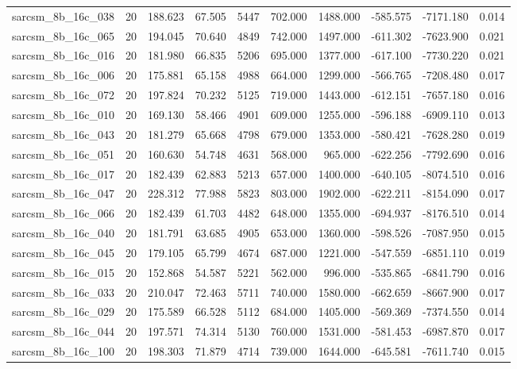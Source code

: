 \begin{tabular}{lrrrrrrrrr}
sarcsm\_8b\_16c\_038 & 20 & 188.623 & 67.505 & 5447 & 702.000 & 1488.000 & -585.575 & -7171.180 & 0.014 \\
sarcsm\_8b\_16c\_065 & 20 & 194.045 & 70.640 & 4849 & 742.000 & 1497.000 & -611.302 & -7623.900 & 0.021 \\
sarcsm\_8b\_16c\_016 & 20 & 181.980 & 66.835 & 5206 & 695.000 & 1377.000 & -617.100 & -7730.220 & 0.021 \\
sarcsm\_8b\_16c\_006 & 20 & 175.881 & 65.158 & 4988 & 664.000 & 1299.000 & -566.765 & -7208.480 & 0.017 \\
sarcsm\_8b\_16c\_072 & 20 & 197.824 & 70.232 & 5125 & 719.000 & 1443.000 & -612.151 & -7657.180 & 0.016 \\
sarcsm\_8b\_16c\_010 & 20 & 169.130 & 58.466 & 4901 & 609.000 & 1255.000 & -596.188 & -6909.110 & 0.013 \\
sarcsm\_8b\_16c\_043 & 20 & 181.279 & 65.668 & 4798 & 679.000 & 1353.000 & -580.421 & -7628.280 & 0.019 \\
sarcsm\_8b\_16c\_051 & 20 & 160.630 & 54.748 & 4631 & 568.000 & 965.000 & -622.256 & -7792.690 & 0.016 \\
sarcsm\_8b\_16c\_017 & 20 & 182.439 & 62.883 & 5213 & 657.000 & 1400.000 & -640.105 & -8074.510 & 0.016 \\
sarcsm\_8b\_16c\_047 & 20 & 228.312 & 77.988 & 5823 & 803.000 & 1902.000 & -622.211 & -8154.090 & 0.017 \\
sarcsm\_8b\_16c\_066 & 20 & 182.439 & 61.703 & 4482 & 648.000 & 1355.000 & -694.937 & -8176.510 & 0.014 \\
sarcsm\_8b\_16c\_040 & 20 & 181.791 & 63.685 & 4905 & 653.000 & 1360.000 & -598.526 & -7087.950 & 0.015 \\
sarcsm\_8b\_16c\_045 & 20 & 179.105 & 65.799 & 4674 & 687.000 & 1221.000 & -547.559 & -6851.110 & 0.019 \\
sarcsm\_8b\_16c\_015 & 20 & 152.868 & 54.587 & 5221 & 562.000 & 996.000 & -535.865 & -6841.790 & 0.016 \\
sarcsm\_8b\_16c\_033 & 20 & 210.047 & 72.463 & 5711 & 740.000 & 1580.000 & -662.659 & -8667.900 & 0.017 \\
sarcsm\_8b\_16c\_029 & 20 & 175.589 & 66.528 & 5112 & 684.000 & 1405.000 & -569.369 & -7374.550 & 0.014 \\
sarcsm\_8b\_16c\_044 & 20 & 197.571 & 74.314 & 5130 & 760.000 & 1531.000 & -581.453 & -6987.870 & 0.017 \\
sarcsm\_8b\_16c\_100 & 20 & 198.303 & 71.879 & 4714 & 739.000 & 1644.000 & -645.581 & -7611.740 & 0.015 \\

\end{tabular}
